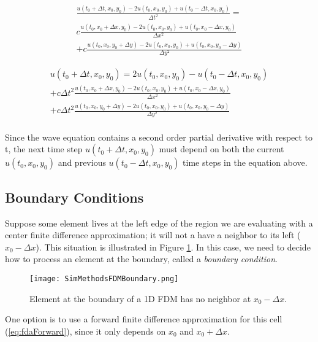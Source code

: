 { \begin{multline}
\frac{u(t_{0} + \Delta  t,x_{0},y_{0})- 2u(t_{0},x_{0},y_{0}) + u(t_{0} -\Delta  t,x_{0},y_{0})}{\Delta  t^{2}} = \\
c\frac{u(t_{0},x_{0} + \Delta  x,y_{0})- 2u(t_{0},x_{0},y_{0}) + u(t_{0},x_{0} -\Delta  x,y_{0})}{\Delta  x^{2}}\\
+c\frac{u(t_{0},x_{0},y_{0}+ \Delta  y)- 2u(t_{0},x_{0},y_{0}) + u(t_{0},x_{0},y_{0} -\Delta  y)}{\Delta  y^{2}}
  \end{multline}
  
   \begin{multline}\label{eq:wavefda2d}
u(t_{0} + \Delta  t,x_{0},y_{0})  = 2u(t_{0},x_{0},y_{0})-u(t_{0} -\Delta  t,x_{0},y_{0})\\
+c\Delta  t^{2}\frac{u(t_{0},x_{0} + \Delta  x,y_{0})- 2u(t_{0},x_{0},y_{0}) + u(t_{0},x_{0} -\Delta  x,y_{0})}{\Delta  x^{2}}\\
+c\Delta  t^{2}\frac{u(t_{0},x_{0},y_{0}+ \Delta  y)- 2u(t_{0},x_{0},y_{0}) + u(t_{0},x_{0},y_{0} -\Delta  y)}{\Delta  y^{2}}
  \end{multline}
\\
Since the wave equation contains a second order partial derivative with respect to t, the next time step $u(t_{0} + \Delta  t,x_{0},y_{0})$ must depend on both the current $u(t_{0},x_{0},y_{0})$ and previous $u(t_{0}-\Delta t,x_{0},y_{0})$ time steps in the equation above.

\subsection{Boundary Conditions}

Suppose some element lives at the left edge of the region we are evaluating with a center finite difference approximation; it will not a have a neighbor to its left ($x_{0}-\Delta x$).  This situation is illustrated in Figure \ref{fig:FDMBoundary}.  In this case, we need to decide how to process an element at the boundary, called a \textit{boundary condition}.\\

\begin{figure}
  \texttt{[image: SimMethodsFDMBoundary.png]}
  \caption{Element at the boundary of a 1D FDM has no neighbor at $x_{0}-\Delta x$.}
  \label{fig:FDMBoundary}
\end{figure}

One option is to use a forward finite difference approximation for this cell (\ref{eq:fdaForward}), since it only depends on $x_{0}$ and $x_{0}+\Delta x$.  

}

